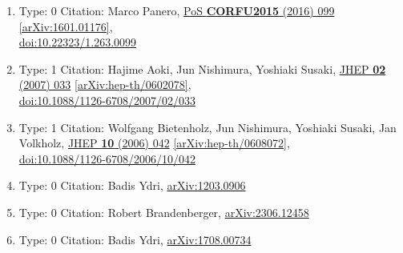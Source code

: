 \documentclass[a4paper,10pt]{article}
\begin{document}
\begin{enumerate}
\begin{enumerate}
  \item Type: 0 Citation: Marco Panero, \href{https://www.doi.org/10.22323/1.263.0099}{PoS {\bf CORFU2015} (2016) 099}  \href{https://arxiv.org/abs/1601.01176}{[arXiv:1601.01176]},\\\href{https://www.doi.org/10.22323/1.263.0099}{doi:10.22323/1.263.0099}
  \item Type: 1 Citation: Hajime Aoki, Jun Nishimura, Yoshiaki Susaki, \href{https://www.doi.org/10.1088/1126-6708/2007/02/033}{JHEP {\bf 02} (2007) 033}  \href{https://arxiv.org/abs/hep-th/0602078}{[arXiv:hep-th/0602078]},\\\href{https://www.doi.org/10.1088/1126-6708/2007/02/033}{doi:10.1088/1126-6708/2007/02/033}
  \item Type: 1 Citation: Wolfgang Bietenholz, Jun Nishimura, Yoshiaki Susaki, Jan Volkholz, \href{https://www.doi.org/10.1088/1126-6708/2006/10/042}{JHEP {\bf 10} (2006) 042}  \href{https://arxiv.org/abs/hep-th/0608072}{[arXiv:hep-th/0608072]},\\\href{https://www.doi.org/10.1088/1126-6708/2006/10/042}{doi:10.1088/1126-6708/2006/10/042}
  \item Type: 0 Citation: Badis Ydri, \href{https://arxiv.org/abs/1203.0906}{arXiv:1203.0906}
  \item Type: 0 Citation: Robert Brandenberger, \href{https://arxiv.org/abs/2306.12458}{arXiv:2306.12458}
  \item Type: 0 Citation: Badis Ydri, \href{https://arxiv.org/abs/1708.00734}{arXiv:1708.00734}

\end{enumerate}
\end{enumerate}
\end{document}
